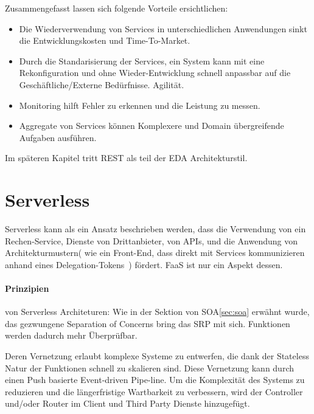 \documentclass[
12pt,
english,
ngerman,
headsepline,
twoside,
openright,
numbers=noenddot,version=first
]{scrreprt}
\begin{document}
Zusammengefasst lassen sich folgende Vorteile ersichtlichen:
\begin{itemize}
	\item Die Wiederverwendung von Services in unterschiedlichen Anwendungen sinkt die Entwicklungskosten und Time-To-Market.
	\item Durch die Standarisierung der Services, ein System kann mit eine Rekonfiguration und ohne Wieder-Entwicklung schnell anpassbar auf die Geschäftliche/Externe Bedürfnisse. Agilität.
	\item Monitoring hilft Fehler zu erkennen und die Leistung zu messen.
	\item Aggregate von Services können Komplexere und Domain übergreifende Aufgaben ausführen.
\end{itemize}\cite{cloudEssentials}

Im späteren Kapitel tritt REST als teil der \acrshort{EDA} Architekturstil.


\section{Serverless}
\label{sec:serverless}

Serverless kann als ein Ansatz beschrieben werden, dass  die Verwendung von ein Rechen-Service, Dienste von Drittanbieter, von \acrfull{API}s, und die Anwendung von Architekturmustern( wie ein Front-End, dass direkt mit Services kommunizieren anhand eines \glqq Delegation-Tokens\grqq\ ) fördert. \acrshort{FaaS} ist nur ein Aspekt dessen.



\paragraph{Prinzipien}\label{par:serverless-principles} von Serverless Architeturen: \cite{serverlessArchAWS}
Wie in der Sektion von \acrshort{SOA}\ref{sec:soa} erwähnt wurde, das gezwungene Separation of Concerns bring das \acrfull{SRP} mit sich. Funktionen werden dadurch mehr Überprüfbar.



Deren Vernetzung erlaubt komplexe Systeme zu entwerfen, die dank der Stateless Natur der Funktionen schnell zu skalieren sind.
Diese Vernetzung kann durch einen Push basierte Event-driven Pipe-line.
Um die Komplexität des Systems zu reduzieren und die längerfristige Wartbarkeit zu verbessern, wird der Controller und/oder Router im Client und Third Party Dienste hinzugefügt.
\end{document}
